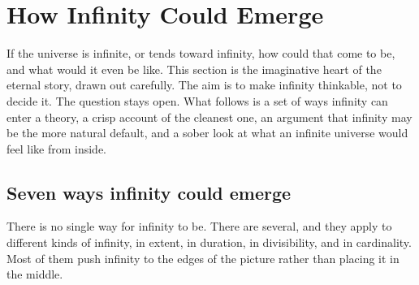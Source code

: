 \section{How Infinity Could Emerge}

If the universe is infinite, or tends toward infinity, how could that come to be, and what would it even be like.
This section is the imaginative heart of the eternal story, drawn out carefully. The aim is to make infinity
thinkable, not to decide it. The question stays open. What follows is a set of ways infinity can enter a theory, a
crisp account of the cleanest one, an argument that infinity may be the more natural default, and a sober look at
what an infinite universe would feel like from inside.

\subsection{Seven ways infinity could emerge}

There is no single way for infinity to be. There are several, and they apply to different kinds of infinity, in
extent, in duration, in divisibility, and in cardinality. Most of them push infinity to the edges of the picture
rather than placing it in the middle.

